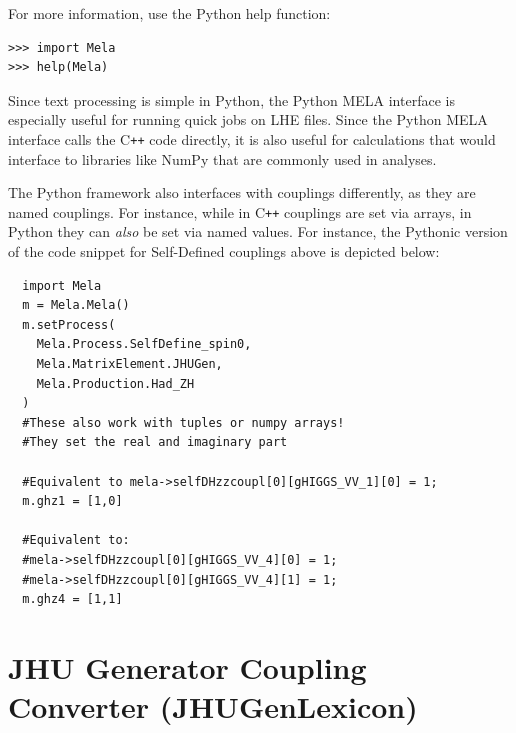 \documentclass[aps,superscriptaddress,nofootinbib]{revtex4}
\begin{document}
For more information, use the Python help function:
\begin{verbatim}
>>> import Mela
>>> help(Mela)
\end{verbatim}
Since text processing is simple in Python, the Python MELA interface is especially useful for running quick jobs on LHE files. Since the Python MELA interface calls the C\texttt{++} code directly, it is also useful for calculations that would interface to libraries like NumPy that are commonly used in analyses.

The Python framework also interfaces with couplings differently, as they are named couplings. For instance, while in C\texttt{++} couplings are set via arrays, in Python they can \textit{also} be set via named values. For instance, the Pythonic version of the code snippet for Self-Defined couplings above is depicted below:
\begin{verbatim}
  import Mela
  m = Mela.Mela()
  m.setProcess(
    Mela.Process.SelfDefine_spin0, 
    Mela.MatrixElement.JHUGen, 
    Mela.Production.Had_ZH
  )
  #These also work with tuples or numpy arrays!
  #They set the real and imaginary part
  
  #Equivalent to mela->selfDHzzcoupl[0][gHIGGS_VV_1][0] = 1;
  m.ghz1 = [1,0] 

  #Equivalent to:
  #mela->selfDHzzcoupl[0][gHIGGS_VV_4][0] = 1;
  #mela->selfDHzzcoupl[0][gHIGGS_VV_4][1] = 1;
  m.ghz4 = [1,1]
\end{verbatim}


\section{JHU Generator Coupling Converter (JHUGenLexicon)}
\end{document}
